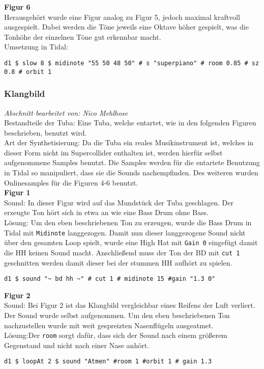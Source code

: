 \documentclass[
10pt, %
a4paper, %
oneside, %
headinclude,footinclude, %
BCOR5mm, %
]{scrartcl}
\begin{document}
\noindent\textbf{Figur 6}\\
Herausgehört wurde eine Figur analog zu Figur 5, jedoch maximal kraftvoll ausgespielt. Dabei werden die Töne jeweils eine Oktave höher gespielt, was die Tonhöhe der einzelnen Töne gut erkennbar macht.\\

\noindent Umsetzung in Tidal:
\begin{lstlisting}
d1 $ slow 8 $ midinote "55 50 48 50" # s "superpiano" # room 0.85 # sz 0.8 # orbit 1
\end{lstlisting}

\subsubsection{Klangbild}
\textit{Abschnitt bearbeitet von: Nico Mehlhose}\\
\noindent Bestandteile der Tuba: Eine Tuba, welche entartet, wie in den folgenden Figuren beschrieben, benutzt wird.\\
Art der Synthetisierung: Da die Tuba ein reales Musikinstrument ist, welches in dieser Form nicht im Supercollider enthalten ist,
werden hierfür selbst aufgenommene Samples benutzt. Die Samples werden für die entartete Benutzung in Tidal so manipuliert, dass sie die Sounds
nachempfinden. Des weiteren wurden Onlinesamples für die Figuren 4-6 benutzt.\cite{Orch}\\

\noindent\textbf{Figur 1}\\
 Sound: In dieser Figur wird auf das Mundstück der Tuba geschlagen. Der erzeugte Ton hört sich in etwa an wie eine Bass Drum ohne Bass.\\
Lösung: Um den eben beschriebenen Ton zu erzeugen, wurde die Bass Drum in Tidal mit \verb|Midinote| langgezogen. Damit nun dieser langgezogene Sound nicht über den gesamten Loop spielt, wurde eine High Hat mit \verb|Gain 0| eingefügt damit die HH keinen Sound macht. Anschließend muss der Ton der BD mit \verb|cut 1| geschnitten werden damit dieser bei der stummen HH aufhört zu spielen.
\begin{lstlisting}
d1 $ sound "~ bd hh ~" # cut 1 # midinote 15 #gain "1.3 0"
\end{lstlisting}

\noindent\textbf{Figur 2}\\
Sound: Bei Figur 2 ist das Klangbild vergleichbar eines Reifens der Luft verliert. Der Sound wurde selbst aufgenommen. Um den eben beschriebenen Ton nachzustellen wurde mit weit gespreizten Nasenflügeln ausgeatmet.\\
Lösung:Der \verb|room| sorgt dafür, dass sich der Sound nach einem größerem Gegenstand und nicht nach einer Nase anhört.
\begin{lstlisting}
d1 $ loopAt 2 $ sound "Atmen" #room 1 #orbit 1 # gain 1.3
\end{lstlisting}
\end{document}
